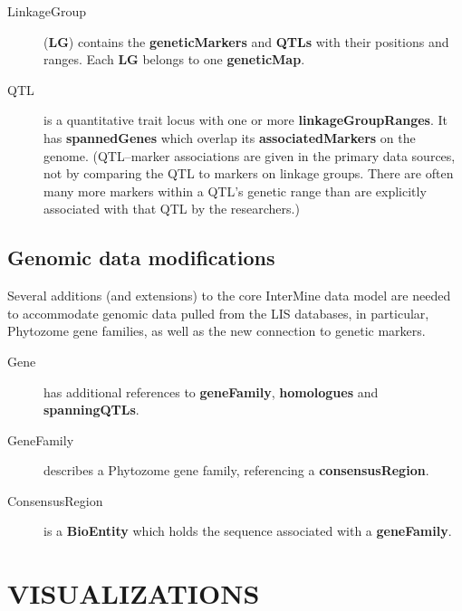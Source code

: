 \documentclass[]{pagposter}
\begin{document}
\begin{multicols*}{3}
\begin{description}
    \item[LinkageGroup] (\textbf{LG}) contains the \textbf{geneticMarkers} and \textbf{QTLs} with their positions and ranges. Each \textbf{LG} belongs to one \textbf{geneticMap}.
      
    \item[QTL] is a quantitative trait locus with one or more \textbf{linkageGroupRanges}. It has \textbf{spannedGenes} which overlap its \textbf{associatedMarkers} on the genome.
      (QTL--marker associations are given in the primary data sources, not by comparing the QTL to markers on linkage groups. There are often many more markers within a QTL's genetic range than are explicitly
      associated with that QTL by the researchers.)

  \end{description}

  \subsection*{Genomic data modifications}

  Several additions (and extensions) to the core InterMine data model are needed to accommodate genomic data pulled from the LIS databases, in particular, Phytozome gene families, as well as the new connection to genetic markers.

  \begin{description}

    \item[Gene] has additional references to \textbf{geneFamily}, \textbf{homologues} and \textbf{spanningQTLs}.

    \item[GeneFamily] describes a Phytozome gene family, referencing a \textbf{consensusRegion}.

    \item[ConsensusRegion] is a \textbf{BioEntity} which holds the sequence associated with a \textbf{geneFamily}.

  \end{description}


  \section*{VISUALIZATIONS}


\end{multicols*}
\end{document}
